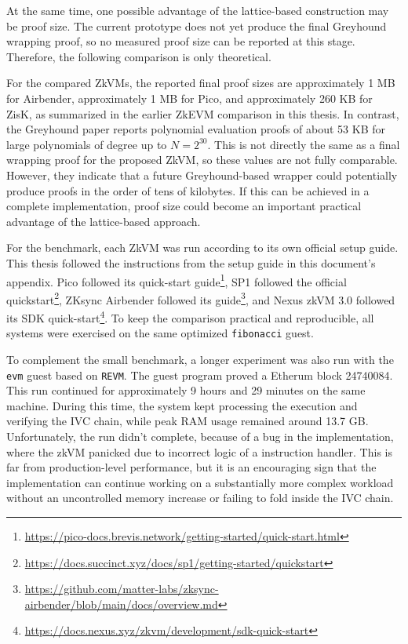 At the same time, one possible advantage of the lattice-based construction may
be proof size. The current prototype does not yet produce the final Greyhound
wrapping proof, so no measured proof size can be reported at this
stage. Therefore, the following comparison is only theoretical.

For the compared ZkVMs, the reported final proof sizes are approximately 1 MB
for Airbender, approximately 1 MB for Pico, and approximately 260 KB for ZisK,
as summarized in the earlier ZkEVM comparison in this thesis. In contrast, the
Greyhound paper reports polynomial evaluation proofs of about 53 KB for large
polynomials of degree up to $N = 2^{30}$. This is not directly the same as a
final wrapping proof for the proposed ZkVM, so these values are not fully
comparable. However, they indicate that a future Greyhound-based wrapper could
potentially produce proofs in the order of tens of kilobytes. If this can be
achieved in a complete implementation, proof size could become an important
practical advantage of the lattice-based approach.

For the benchmark, each ZkVM was run according to its own official
setup guide. This thesis followed the instructions from the setup guide in this
document's appendix. Pico followed its quick-start guide\footnote{\url{https://pico-docs.brevis.network/getting-started/quick-start.html}},
SP1 followed the official quickstart\footnote{\url{https://docs.succinct.xyz/docs/sp1/getting-started/quickstart}},
ZKsync Airbender followed its guide\footnote{\url{https://github.com/matter-labs/zksync-airbender/blob/main/docs/overview.md}},
and Nexus zkVM 3.0 followed its SDK quick-start\footnote{\url{https://docs.nexus.xyz/zkvm/development/sdk-quick-start}}.
To keep the comparison practical and reproducible, all systems were exercised on
the same optimized \texttt{fibonacci} guest.

To complement the small benchmark, a longer experiment was also run
with the \texttt{evm} guest based on \texttt{REVM}. The guest program proved
a Etherum block 24740084. This run continued for
approximately 9 hours and 29 minutes on the same machine. During this time, the
system kept processing the execution and verifying the IVC chain, while peak RAM
usage remained around 13.7 GB. Unfortunately, the run didn't complete, because
of a bug in the implementation, where the zkVM panicked due to incorrect logic
of a instruction handler.
This is far from production-level
performance, but it is an encouraging sign that the implementation can continue
working on a substantially more complex workload without an uncontrolled memory
increase or failing to fold inside the IVC chain.

